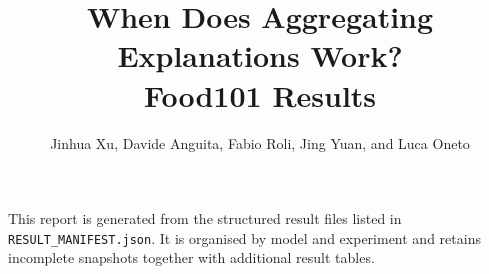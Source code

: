 \documentclass[10pt,a4paper]{article}
\title{When Does Aggregating Explanations Work?\\\large Food101 Results}
\author{Jinhua Xu, Davide Anguita, Fabio Roli, Jing Yuan, and Luca Oneto}
\date{}
\begin{document}
\maketitle

\noindent
This report is generated from the structured result files listed in
\texttt{RESULT\_MANIFEST.json}. It is organised by model and experiment
and retains incomplete snapshots together with additional result tables.


\end{document}
